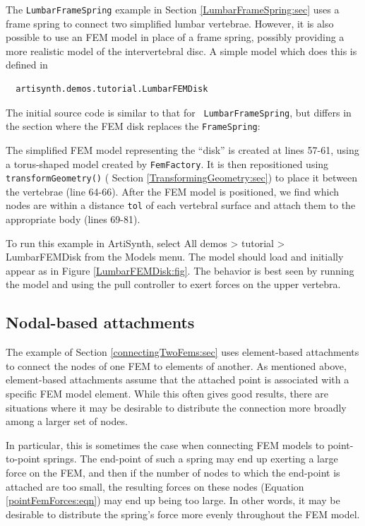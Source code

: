 The {\tt LumbarFrameSpring} example in
Section \ref{LumbarFrameSpring:sec} uses a frame spring to connect two
simplified lumbar vertebrae. However, it is also possible to use an
FEM model in place of a frame spring, possibly providing a more
realistic model of the intervertebral disc. A simple model which does
this is defined in
%
\begin{verbatim}
  artisynth.demos.tutorial.LumbarFEMDisk
\end{verbatim}
%
The initial source code is similar to that for {\tt
LumbarFrameSpring}, but differs in the section where the FEM disk
replaces the {\tt FrameSpring}:
\lstset{numbers=left}
\iflatexml

\else

\fi
\lstset{numbers=none}

The simplified FEM model representing the ``disk'' is created at lines
57-61, using a torus-shaped model created by {\tt FemFactory}.  It is
then repositioned using {\tt transformGeometry()} (
Section \ref{TransformingGeometry:sec}) to place it between the
vertebrae (line 64-66).  After the FEM model is positioned, we find
which nodes are within a distance {\tt tol} of each vertebral surface
and attach them to the appropriate body (lines 69-81).

To run this example in ArtiSynth, select {\sf All demos > tutorial >
LumbarFEMDisk} from the {\sf Models} menu. The model should load and
initially appear as in Figure \ref{LumbarFEMDisk:fig}.  The
behavior is best seen by running the model and using the pull
controller to exert forces on the upper vertebra.

\subsection{Nodal-based attachments}
\label{sec:fem:nodalAttachments}

The example of Section \ref{connectingTwoFems:sec} uses element-based
attachments to connect the nodes of one FEM to elements of another.
As mentioned above, element-based attachments assume that the attached
point is associated with a specific FEM model element. 
While this often gives good results, there are situations where it may
be desirable to distribute the connection more broadly among a larger
set of nodes. 

In particular, this is sometimes the case when connecting FEM models
to point-to-point springs. The end-point of such a spring may end up
exerting a large force on the FEM, and then if the number of nodes to
which the end-point is attached are too small, the resulting forces on
these nodes (Equation \ref{pointFemForces:eqn}) may end up being too
large. In other words, it may be desirable to distribute the spring's
force more evenly throughout the FEM model. 

